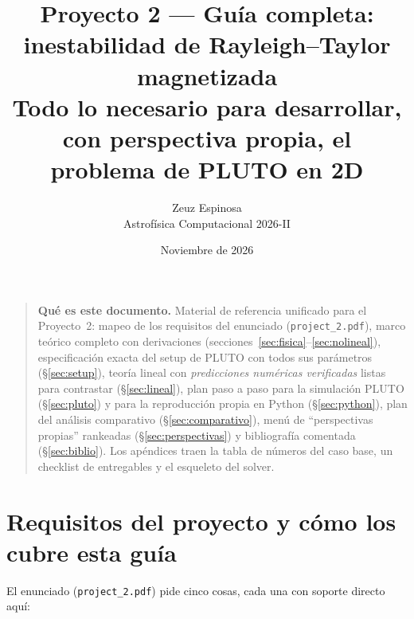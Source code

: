 \documentclass[11pt,a4paper]{article}
\title{\textbf{Proyecto 2 — Guía completa: inestabilidad de Rayleigh--Taylor magnetizada}\\[4pt]
\large Todo lo necesario para desarrollar, con perspectiva propia, el problema
\code{Test\_Problems/MHD/Rayleigh\_Taylor} de PLUTO en 2D}
\author{Zeuz Espinosa\\ Astrof\'isica Computacional 2026-II}
\date{Noviembre de 2026}
\newcommand{\code}[1]{\texttt{#1}}
\begin{document}
\maketitle

\begin{quote}\small
\textbf{Qué es este documento.} Material de referencia unificado para el Proyecto~2:
mapeo de los requisitos del enunciado (\code{project\_2.pdf}), marco teórico completo con
derivaciones (secciones~\ref{sec:fisica}--\ref{sec:nolineal}), especificación exacta del
setup de PLUTO con todos sus parámetros (\S\ref{sec:setup}), teoría lineal con
\emph{predicciones numéricas verificadas} listas para contrastar (\S\ref{sec:lineal}),
plan paso a paso para la simulación PLUTO (\S\ref{sec:pluto}) y para la reproducción
propia en Python (\S\ref{sec:python}), plan del análisis comparativo (\S\ref{sec:comparativo}),
menú de ``perspectivas propias'' rankeadas (\S\ref{sec:perspectivas}) y bibliografía
comentada (\S\ref{sec:biblio}). Los apéndices traen la tabla de números del caso base,
un checklist de entregables y el esqueleto del solver.
\end{quote}

\tableofcontents
\clearpage

\section{Requisitos del proyecto y cómo los cubre esta guía}
\label{sec:requisitos}

El enunciado (\code{project\_2.pdf}) pide cinco cosas, cada una con soporte directo aquí:
\end{document}
